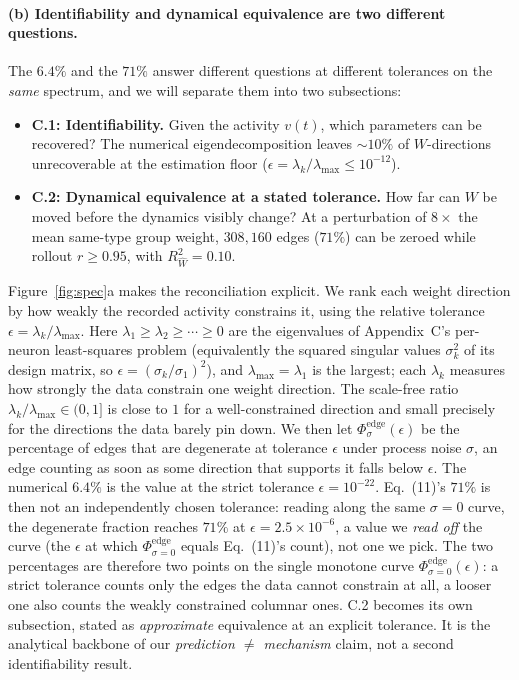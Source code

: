 \documentclass[11pt]{article}
\newcommand{\lmax}{\lambda_{\max}}
\newcommand{\Rw}{R^2_{\widehat W}}
\begin{document}
\paragraph{(b) Identifiability and dynamical equivalence are two different
questions.}
The $6.4\%$ and the $71\%$ answer different questions at different tolerances on
the \emph{same} spectrum, and we will separate them into two subsections:
\begin{itemize}[leftmargin=1.4em,itemsep=1pt,topsep=2pt]
  \item \textbf{C.1: Identifiability.} Given the activity $v(t)$, which
  parameters can be recovered? The numerical eigendecomposition leaves
  $\sim\!10\%$ of $W$-directions unrecoverable at the estimation floor
  ($\epsilon=\lambda_k/\lmax\le 10^{-12}$).
  \item \textbf{C.2: Dynamical equivalence at a stated tolerance.} How far can
  $W$ be moved before the dynamics visibly change? At a perturbation of $8\times$
  the mean same-type group weight, $308{,}160$ edges ($71\%$) can be zeroed while
  rollout $r\ge0.95$, with $\Rw=0.10$.
\end{itemize}
Figure~\ref{fig:spec}a makes the reconciliation explicit. We rank each weight
direction by how weakly the recorded activity constrains it, using the relative
tolerance $\epsilon=\lambda_k/\lmax$. Here $\lambda_1\ge\lambda_2\ge\cdots\ge0$ are
the eigenvalues of Appendix~C's per-neuron least-squares problem (equivalently the
squared singular values $\sigma_k^2$ of its design matrix, so
$\epsilon=(\sigma_k/\sigma_1)^2$), and $\lmax=\lambda_1$ is the largest; each
$\lambda_k$ measures how strongly the data constrain one weight direction. The
scale-free ratio $\lambda_k/\lmax\in(0,1]$ is close to $1$ for a well-constrained
direction and small precisely for the directions the data barely pin down. We then let $\Phi^{\mathrm{edge}}_\sigma(\epsilon)$ be the percentage of
edges that are degenerate at tolerance $\epsilon$ under process noise $\sigma$, an
edge counting as soon as some direction that supports it falls below $\epsilon$.
The numerical $6.4\%$ is the value at the strict tolerance $\epsilon=10^{-22}$.
Eq.~(11)'s $71\%$ is then not an independently chosen tolerance: reading along the
same $\sigma=0$ curve, the degenerate fraction reaches $71\%$ at
$\epsilon=2.5\times10^{-6}$, a value we \emph{read off} the curve (the $\epsilon$
at which $\Phi^{\mathrm{edge}}_{\sigma=0}$ equals Eq.~(11)'s count), not one we
pick. The two percentages are therefore two points on the single monotone curve
$\Phi^{\mathrm{edge}}_{\sigma=0}(\epsilon)$: a strict tolerance counts only the
edges the data cannot constrain at all, a looser one also counts the weakly
constrained columnar ones. C.2 becomes its own subsection, stated as
\emph{approximate} equivalence at an explicit tolerance. It is the analytical
backbone of our \emph{prediction $\ne$ mechanism} claim, not a second
identifiability result.
\end{document}
